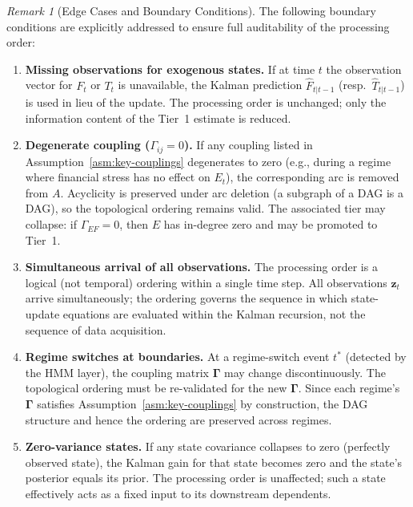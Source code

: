 \documentclass[12pt,openany]{book}
\newcommand{\bfGamma}{\boldsymbol{\Gamma}}
\newcommand{\calE}{\mathcal{E}}
\newcommand{\calF}{\mathcal{F}}
\newcommand{\calT}{\mathcal{T}}
\numberwithin{equation}{chapter}
\theoremstyle{plain}
\theoremstyle{definition}
\theoremstyle{remark}
\newtheorem{remark}[theorem]{Remark}
\def\mathcal#1{#1}%
\begin{document}
\begin{remark}[Edge Cases and Boundary Conditions]
\label{rem:edge-cases-ordering}
The following boundary conditions are explicitly addressed to
ensure full auditability of the processing order:
\begin{enumerate}
  \item \textbf{Missing observations for exogenous states.}
        If at time $t$ the observation vector for $\calF_t$
        or $\calT_t$ is unavailable, the Kalman prediction
        $\hat{\calF}_{t|t-1}$ (resp.\ $\hat{\calT}_{t|t-1}$)
        is used in lieu of the update.  The processing order
        is unchanged; only the information content of the
        Tier~1 estimate is reduced.
  \item \textbf{Degenerate coupling ($\Gamma_{ij} = 0$).}
        If any coupling listed in
        Assumption~\ref{asm:key-couplings} degenerates to
        zero (e.g., during a regime where financial stress
        has no effect on $\calE_t$), the corresponding arc
        is removed from $\mathcal{A}$.  Acyclicity is
        preserved under arc deletion
        (a subgraph of a DAG is a DAG), so the
        topological ordering remains valid.  The associated
        tier may collapse: if $\Gamma_{\calE\calF}=0$,
        then $\calE$ has in-degree zero and may be promoted
        to Tier~1.
  \item \textbf{Simultaneous arrival of all observations.}
        The processing order is a logical (not temporal)
        ordering within a single time step.  All
        observations $\mathbf{z}_t$ arrive simultaneously;
        the ordering governs the sequence in which
        state-update equations are evaluated within
        the Kalman recursion, not the sequence of
        data acquisition.
  \item \textbf{Regime switches at boundaries.}
        At a regime-switch event $t^*$ (detected by the
        HMM layer), the coupling matrix $\bfGamma$ may
        change discontinuously.  The topological ordering
        must be re-validated for the new $\bfGamma$.
        Since each regime's $\bfGamma$ satisfies
        Assumption~\ref{asm:key-couplings} by construction,
        the DAG structure and hence the ordering are
        preserved across regimes.
  \item \textbf{Zero-variance states.}
        If any state covariance collapses to zero (perfectly
        observed state), the Kalman gain for that state
        becomes zero and the state's posterior equals its
        prior.  The processing order is unaffected; such a
        state effectively acts as a fixed input to its
        downstream dependents.
\end{enumerate}
\end{remark}
\end{document}

